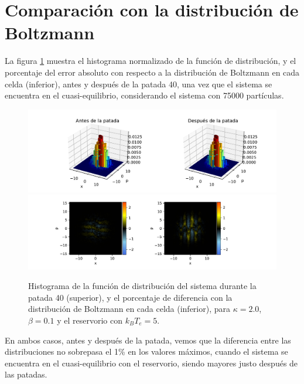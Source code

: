 \documentclass[letterpaper,12pt,oneside]{book}
\begin{document}
\section{Comparación con la distribución de Boltzmann}

La figura \ref{fig:ComparacionBoltzmann} muestra el histograma normalizado de la función de distribución, y el porcentaje del error absoluto con respecto a la distribución de Boltzmann en cada celda (inferior), antes y después de la patada 40, una vez que el sistema se encuentra en el cuasi-equilibrio, considerando el sistema con 75000 partículas.

\begin{figure}[h!]
	
	\hspace{-0.5cm}
	\includegraphics[width=18cm]{Figs/DistribucionesK20T5Kick40}\\
	
	
	\hspace{-0.2cm}
	\includegraphics[width=20cm]{Figs/DiferenciasK20T5Kick40}
	\caption{Histograma de la función de distribución del sistema durante la patada 40 (superior), y el porcentaje de diferencia con la distribución de Boltzmann en cada celda (inferior), para $\kappa=2.0$, $\beta=0.1$ y el reservorio con $k_BT_e = 5$.}
	\label{fig:ComparacionBoltzmann}
\end{figure}


En ambos casos, antes y después de la patada, vemos que la diferencia entre las distribuciones no sobrepasa el 1\% en los valores máximos, cuando el sistema se encuentra en el cuasi-equilibrio con el reservorio,  siendo mayores justo después de las patadas.
\end{document}
